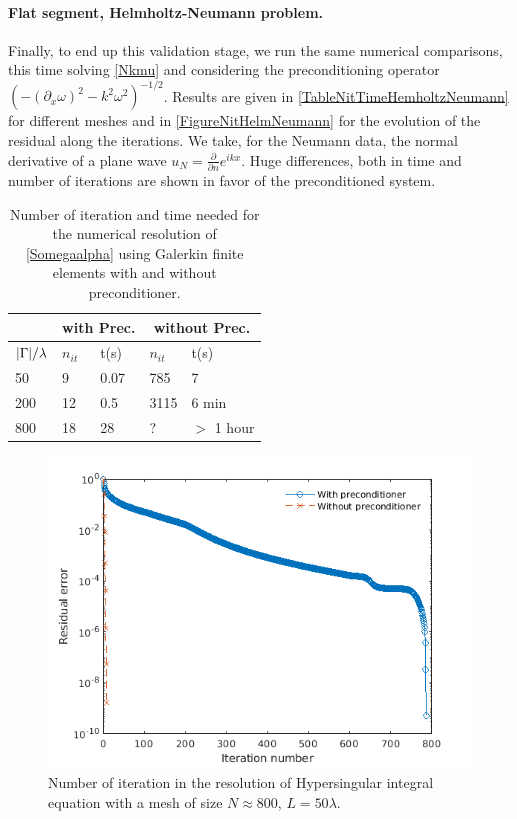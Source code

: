 \documentclass[a4paper]{article}
\begin{document}
\paragraph{Flat segment, Helmholtz-Neumann problem.} 
Finally, to end up this validation stage, we run the same numerical comparisons, this time solving \eqref{Nkmu} and considering the preconditioning operator 
$\left(-(\partial_x \omega)^2 - k^2 \omega^2\right)^{-1/2}$. Results are given in \autoref{TableNitTimeHemholtzNeumann} for different meshes and in
\autoref{FigureNitHelmNeumann} for the evolution of the residual along the iterations. We take, for the Neumann data, the normal derivative of a plane wave $u_N = \frac{\partial}{\partial n} e^{ikx}$. Huge differences, both in time and number of iterations are
shown in favor of the preconditioned system.
\begin{table}[H]
	\begin{center}
		\begin{tabular}{m{4em} | m{4em} | m{4em} | m{4em} | m{4em}} 
			\hline
			\multicolumn{1}{c|}{ }&
			\multicolumn{2}{c|}{with Prec.}&\multicolumn{2}{c}{without Prec.}\\
			\hline
			${\left\lvert \Gamma \right\rvert}/{\lambda}$ & $n_{it}$& t(s) & $n_{it}$ & t(s)\\
			\hline\hline
			50 & 9 & 0.07		 & 785 & 7 \\
			\hline
			200 & 12 & 0.5 & 3115 &  6 min\\
			\hline
			800 & 18 & 28 & ? &  $>$ 1 hour \\
			\hline
		\end{tabular}
	\end{center}	
	\caption{Number of iteration and time needed for the numerical resolution of \eqref{Somegaalpha} using Galerkin finite elements with and without preconditioner.}
	\label{TableNitTimeHemholtzNeumann}
\end{table}
\vspace{-1cm}
\begin{figure}[H]
	\centering
	\includegraphics[scale=0.5]{figs/PrecondNeumannHelmSegPDFbis}
	\caption{Number of iteration in the resolution of Hypersingular integral equation with a mesh of size $N \approx 800$, $L = 50 \lambda$. }
	\label{FigureNitHelmNeumann}
\end{figure}
\end{document}
